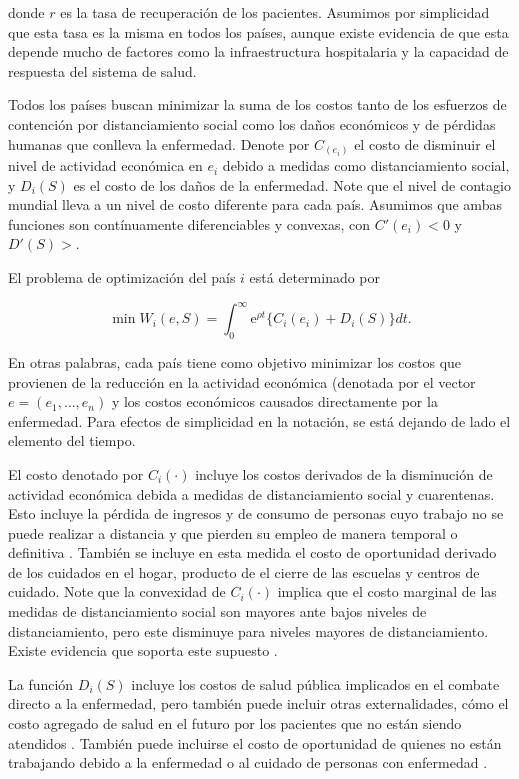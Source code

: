 \documentclass[11pt, oneside]{article}
\begin{document}
donde $r$ es la tasa de recuperación de los pacientes. Asumimos por simplicidad que esta tasa es la misma en todos los países, aunque existe evidencia de que esta depende mucho de factores como la infraestructura hospitalaria y la capacidad de respuesta del sistema de salud. 

Todos los países buscan minimizar la suma de los costos tanto de los esfuerzos de contención por distanciamiento social como los daños económicos y de pérdidas humanas que conlleva la enfermedad. Denote por $C_(e_i)$ el costo de disminuir el nivel de actividad económica en $e_i$ debido a medidas como distanciamiento social, y $D_i(S)$ es el costo de los daños de la enfermedad. Note que el nivel de contagio mundial lleva a un nivel de costo diferente para cada país. Asumimos que ambas funciones son contínuamente diferenciables y convexas, con $C'(e_i) < 0$ y $D'(S) >$.

El problema de optimización del país $i$ está determinado por

\begin{equation}
	\min W_i(e,S) = \int_0^\infty \ensuremath{\mathrm{e}}^{\rho t}\{C_i(e_i) + D_i(S)\} dt.
\end{equation}

En otras palabras, cada país tiene como objetivo minimizar los costos que provienen de la reducción en la actividad económica (denotada por el vector $e = (e_1,\dots,e_n)$ y los costos económicos causados directamente por la enfermedad. Para efectos de simplicidad en la notación, se está dejando de lado el elemento del tiempo.

El costo denotado por $C_i(\cdot)$ incluye los costos derivados de la disminución de actividad económica debida a medidas de distanciamiento social y cuarentenas. Esto incluye la pérdida de ingresos y de consumo de personas cuyo trabajo no se puede realizar a distancia y que pierden su empleo de manera temporal o definitiva \cite{sdffsadaf}. También se incluye en esta medida el costo de oportunidad derivado de los cuidados en el hogar, producto de el cierre de las escuelas y centros de cuidado. Note que la convexidad de $C_i(\cdot)$ implica que el costo marginal de las medidas de distanciamiento social son mayores ante bajos niveles de distanciamiento, pero este disminuye para niveles mayores de distanciamiento. Existe evidencia que soporta este supuesto \cite{evidencia}.

La función $D_i(S)$ incluye los costos de salud pública implicados en el combate directo a la enfermedad, pero también puede incluir otras externalidades, cómo el costo agregado de salud en el futuro por los pacientes que no están siendo atendidos \cite{alguien}. También puede incluirse el costo de oportunidad de quienes no están trabajando debido a la enfermedad o al cuidado de personas con enfermedad \cite{}.
 
\end{document}
